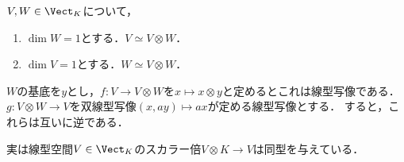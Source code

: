 \documentclass[uplatex, dvipdfmx]{jsreport}
\begin{document}
\begin{proposition}
    $V,W\in\Vect_K$について，
    \begin{enumerate}
        \item $\dim W=1$とする．$V\simeq V\otimes W$．
        \item $\dim V=1$とする．$W\simeq V\otimes W$．
    \end{enumerate}
\end{proposition}
\begin{Proof}
    $W$の基底を$y$とし，$f:V\to V\otimes W$を$x\mapsto x\otimes y$と定めるとこれは線型写像である．
    $g:V\otimes W\to V$を双線型写像$(x,ay)\mapsto ax$が定める線型写像とする．
    すると，これらは互いに逆である．
\end{Proof}
\begin{remarks}
    実は線型空間$V\in\Vect_K$のスカラー倍$V\otimes K\to V$は同型を与えている．
\end{remarks}
\end{document}

